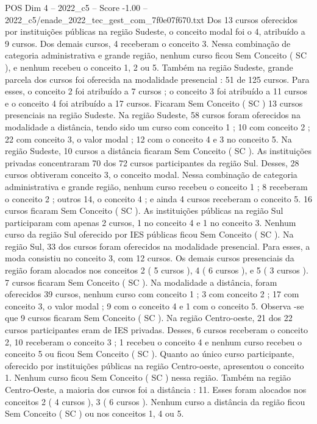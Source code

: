 \begin{textsample}{POS Dim 4 – 2022\_c5 – Score -1.00 – 2022\_c5/enade\_2022\_tec\_gest\_com\_7f0e07f670.txt}
Dos 13 cursos oferecidos por instituições públicas na região Sudeste, o conceito modal foi o 4, atribuído a 9 cursos.
Dos demais cursos, 4 receberam o conceito 3.
Nessa combinação de categoria administrativa e grande região, nenhum curso ficou Sem Conceito ( SC ), e nenhum recebeu o conceito 1, 2 ou 5.
Também na região Sudeste, grande parcela dos cursos foi oferecida na modalidade presencial : 51 de 125 cursos.
Para esses, o conceito 2 foi atribuído a 7 cursos ; o conceito 3 foi atribuído a 11 cursos e o conceito 4 foi atribuído a 17 cursos.
Ficaram Sem Conceito ( SC ) 13 cursos presenciais na região Sudeste.
Na região Sudeste, 58 cursos foram oferecidos na modalidade a distância, tendo sido um curso com conceito 1 ; 10 com conceito 2 ; 22 com conceito 3, o valor modal ; 12 com o conceito 4 e 3 no conceito 5.
Na região Sudeste, 10 cursos a distância ficaram Sem Conceito ( SC ).
As instituições privadas concentraram 70 dos 72 cursos participantes da região Sul.
Desses, 28 cursos obtiveram conceito 3, o conceito modal.
Nessa combinação de categoria administrativa e grande região, nenhum curso recebeu o conceito 1 ; 8 receberam o conceito 2 ; outros 14, o conceito 4 ; e ainda 4 cursos receberam o conceito 5. 16 cursos ficaram Sem Conceito ( SC ).
As instituições públicas na região Sul participaram com apenas 2 cursos, 1 no conceito 4 e 1 no conceito 3.
Nenhum curso da região Sul oferecido por IES públicas ficou Sem Conceito ( SC ).
Na região Sul, 33 dos cursos foram oferecidos na modalidade presencial.
Para esses, a moda consistiu no conceito 3, com 12 cursos.
Os demais cursos presenciais da região foram alocados nos conceitos 2 ( 5 cursos ), 4 ( 6 cursos ), e 5 ( 3 cursos ). 7 cursos ficaram Sem Conceito ( SC ).
Na modalidade a distância, foram oferecidos 39 cursos, nenhum curso com conceito 1 ; 3 com conceito 2 ; 17 com conceito 3, o valor modal ; 9 com o conceito 4 e 1 com o conceito 5.
Observa -se que 9 cursos ficaram Sem Conceito ( SC ).
Na região Centro-oeste, 21 dos 22 cursos participantes eram de IES privadas.
Desses, 6 cursos receberam o conceito 2, 10 receberam o conceito 3 ; 1 recebeu o conceito 4 e nenhum curso recebeu o conceito 5 ou ficou Sem Conceito ( SC ).
Quanto ao único curso participante, oferecido por instituições públicas na região Centro-oeste, apresentou o conceito 1.
Nenhum curso ficou Sem Conceito ( SC ) nessa região.
Também na região Centro-Oeste, a maioria dos cursos foi a distância : 11.
Esses foram alocados nos conceitos 2 ( 4 cursos ), 3 ( 6 cursos ).
Nenhum curso a distância da região ficou Sem Conceito ( SC ) ou nos conceitos 1, 4 ou 5.

\end{textsample}
